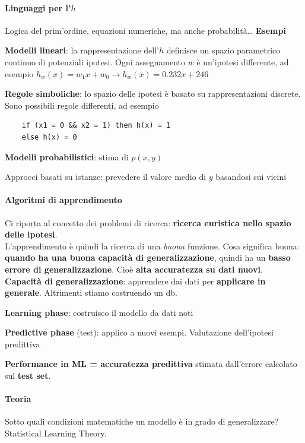 \documentclass[10pt]{book}
\begin{document}
\paragraph{Linguaggi per l'$h$} Logica del prim'ordine, equazioni numeriche, ma anche probabilità\ldots
\textbf{Esempi}
\begin{list}{}{}
	\item \textbf{Modelli lineari}: la rappresentazione dell'$h$ definisce un spazio parametrico continuo di potenziali ipotesi. Ogni assegnamento $w$ è un'ipotesi differente, ad esempio $h_w(x) = w_1 x + w_0 \rightarrow h_w(x) = 0.232x + 246$
	\item \textbf{Regole simboliche}: lo spazio delle ipotesi è basato su rappresentazioni discrete. Sono possibili regole differenti, ad esempio
	\begin{lstlisting}
	if (x1 = 0 && x2 = 1) then h(x) = 1
	else h(x) = 0
	\end{lstlisting}
	\item \textbf{Modelli probabilistici}: stima di $p(x, y)$
	\item Approcci basati su istanze: prevedere il valore medio di $y$ basandosi sui vicini
\end{list}
\pagebreak
\paragraph{Algoritmi di apprendimento} Ci riporta al concetto dei problemi di ricerca: \textbf{ricerca euristica nello spazio delle ipotesi}.\\
L'apprendimento è quindi la ricerca di una \textit{buona} funzione. Cosa significa buona: \textbf{quando ha una buona capacità di generalizzazione}, quindi ha un \textbf{basso errore di generalizzazione}. Cioè \textbf{alta accuratezza su dati nuovi}.\\
\textbf{Capacità di generalizzazione}: apprendere dai dati per \textbf{applicare in generale}. Altrimenti stiamo costruendo un db.
\begin{list}{}{}
	\item \textbf{Learning phase}: costruisco il modello da dati noti
	\item \textbf{Predictive phase} (test): applico a nuovi esempi. Valutazione dell'ipotesi predittiva
\end{list}
\textbf{Performance in ML = accuratezza predittiva} stimata dall'errore calcolato sul \textbf{test set}.
\paragraph{Teoria} Sotto quali condizioni matematiche un modello è in grado di generalizzare? Statistical Learning Theory.
\end{document}
